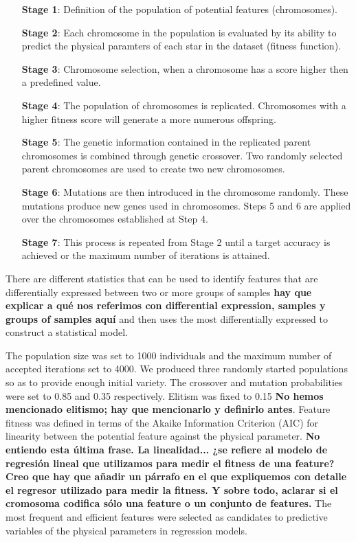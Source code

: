 {\begin{itemize}
\item [\textbf{Stage 1}:]{Definition of the population of potential features (chromosomes).}
\item [\textbf{Stage 2}:]{Each chromosome in the population is evaluated by its ability to
predict the physical paramters of each star in the dataset (fitness
function).}
\item [\textbf{Stage 3}:]{Chromosome selection, when a chromosome has 
 a score higher then a predefined value.}
\item [\textbf{Stage 4}:]{The population of chromosomes is replicated. 
 Chromosomes with a higher fitness score will generate a more numerous
 offspring.}
\item [\textbf{Stage 5}:]{The genetic information contained in the replicated parent
chromosomes is combined through genetic crossover. Two randomly
selected parent chromosomes are used to create two new chromosomes.}
\item [\textbf{Stage 6}:]{Mutations are then introduced in the chromosome randomly. 
 These mutations produce new genes used in chromosomes.  Steps 5 and 6
 are applied over the chromosomes established at Step 4.}
\item [\textbf{Stage 7}:]{This process is repeated from Stage 2 until 
  a target accuracy is achieved or the maximum number of iterations is
  attained.}
\end{itemize}

There are different statistics that can be used to identify features
that are differentially expressed between two or more groups of
samples {\bf hay que explicar a qué nos referimos con differential
expression, samples y groups of samples aquí} and then uses the most
differentially expressed to construct a statistical model.

The population size was set to 1000 individuals and the maximum number
of accepted iterations set to 4000. We produced three randomly started
populations so as to provide enough initial variety. The crossover and
mutation probabilities were set to 0.85 and 0.35 respectively. Elitism
was fixed to 0.15 {\bf No hemos mencionado elitismo; hay que
mencionarlo y definirlo antes}.  Feature fitness was defined in terms
of the Akaike Information Criterion (AIC) for linearity between the
potential feature against the physical parameter. {\bf No entiendo
esta última frase. La linealidad... ¿se refiere al modelo de regresión
lineal que utilizamos para medir el fitness de una feature? Creo que
hay que añadir un párrafo en el que expliquemos con detalle el
regresor utilizado para medir la fitness. Y sobre todo, aclarar si el
cromosoma codifica sólo una feature o un conjunto de features.} The
most frequent and efficient features were selected as candidates to
predictive variables of the physical parameters in regression models.

}
